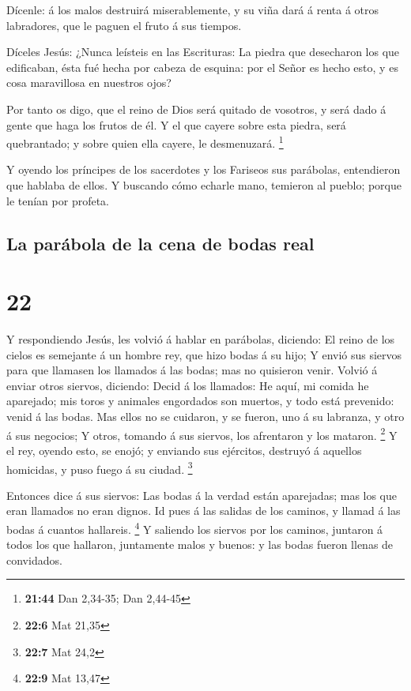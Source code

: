  Dícenle: á los malos destruirá miserablemente, y su viña
dará á renta á otros labradores, que le paguen el fruto á sus tiempos.

 Díceles Jesús: ¿Nunca leísteis en las Escrituras: La
piedra que desecharon los que edificaban, ésta fué hecha por cabeza de
esquina: por el Señor es hecho esto, y es cosa maravillosa en nuestros
ojos?

 Por tanto os digo, que el reino de Dios será quitado de
vosotros, y será dado á gente que haga los frutos de él. 
Y el que cayere sobre esta piedra, será quebrantado; y sobre quien ella
cayere, le desmenuzará. \footnote{\textbf{21:44} Dan 2,34-35; Dan
  2,44-45}

 Y oyendo los príncipes de los sacerdotes y los Fariseos
sus parábolas, entendieron que hablaba de ellos.  Y
buscando cómo echarle mano, temieron al pueblo; porque le tenían por
profeta.

\hypertarget{la-paruxe1bola-de-la-cena-de-bodas-real}{%
\subsection{La parábola de la cena de bodas
real}\label{la-paruxe1bola-de-la-cena-de-bodas-real}}

\hypertarget{section-21}{%
\section{22}\label{section-21}}

 Y respondiendo Jesús, les volvió á hablar en parábolas,
diciendo:  El reino de los cielos es semejante á un hombre
rey, que hizo bodas á su hijo;  Y envió sus siervos para
que llamasen los llamados á las bodas; mas no quisieron venir.
 Volvió á enviar otros siervos, diciendo: Decid á los
llamados: He aquí, mi comida he aparejado; mis toros y animales
engordados son muertos, y todo está prevenido: venid á las bodas.
 Mas ellos no se cuidaron, y se fueron, uno á su labranza,
y otro á sus negocios;  Y otros, tomando á sus siervos,
los afrentaron y los mataron. \footnote{\textbf{22:6} Mat 21,35}
 Y el rey, oyendo esto, se enojó; y enviando sus
ejércitos, destruyó á aquellos homicidas, y puso fuego á su ciudad.
\footnote{\textbf{22:7} Mat 24,2}

 Entonces dice á sus siervos: Las bodas á la verdad están
aparejadas; mas los que eran llamados no eran dignos.  Id
pues á las salidas de los caminos, y llamad á las bodas á cuantos
hallareis. \footnote{\textbf{22:9} Mat 13,47}  Y saliendo
los siervos por los caminos, juntaron á todos los que hallaron,
juntamente malos y buenos: y las bodas fueron llenas de convidados.

